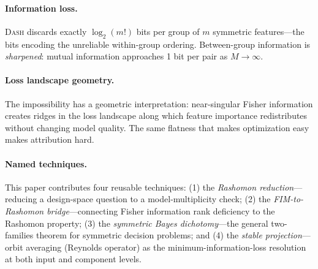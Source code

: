 \documentclass{jmlr}
\newcommand{\DASH}{\textsc{Dash}}
\begin{document}
\paragraph{Information loss.}
\DASH{} discards exactly $\log_2(m!)$ bits per group of $m$ symmetric features---the bits encoding the unreliable within-group ordering. Between-group information is \emph{sharpened}: mutual information approaches 1 bit per pair as $M \to \infty$.

\paragraph{Loss landscape geometry.}
The impossibility has a geometric interpretation: near-singular Fisher information creates ridges in the loss landscape along which feature importance redistributes without changing model quality. The same flatness that makes optimization easy makes attribution hard.

\paragraph{Named techniques.}
This paper contributes four reusable techniques: (1) the \emph{Rashomon reduction}---reducing a design-space question to a model-multiplicity check; (2) the \emph{FIM-to-Rashomon bridge}---connecting Fisher information rank deficiency to the Rashomon property; (3) the \emph{symmetric Bayes dichotomy}---the general two-families theorem for symmetric decision problems; and (4) the \emph{stable projection}---orbit averaging (Reynolds operator) as the minimum-information-loss resolution at both input and component levels.
\end{document}
